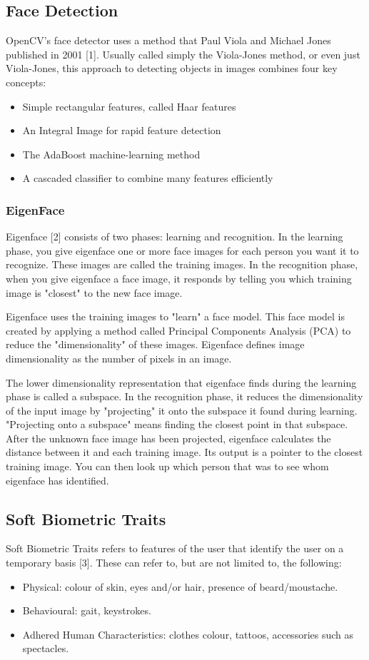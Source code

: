 \documentclass[12pt]{article}			%
\begin{document}
\subsection{ Face Detection }
OpenCV's face detector uses a method that Paul Viola and Michael Jones published in 2001 [1]. Usually called simply the Viola-Jones method, or even just Viola-Jones, this approach to detecting objects in images combines four key concepts:
\begin{itemize}
	\item{} Simple rectangular features, called Haar features
	\item{} An Integral Image for rapid feature detection
	\item{} The AdaBoost machine-learning method
	\item{} A cascaded classifier to combine many features efficiently
\end{itemize}

\subsubsection{ EigenFace }
Eigenface [2] consists of two phases: learning and recognition. In the learning phase, you give eigenface one or more face images for each person you want it to recognize. These images are called the training images. In the recognition phase, when you give eigenface a face image, it responds by telling you which training image is "closest" to the new face image.

Eigenface uses the training images to "learn" a face model. This face model is created by applying a method called Principal Components Analysis (PCA) to reduce the "dimensionality" of these images. Eigenface defines image dimensionality as the number of pixels in an image.

The lower dimensionality representation that eigenface finds during the learning phase is called a subspace. In the recognition phase, it reduces the dimensionality of the input image by "projecting" it onto the subspace it found during learning. "Projecting onto a subspace" means finding the closest point in that subspace. After the unknown face image has been projected, eigenface calculates the distance between it and each training image. Its output is a pointer to the closest training image. You can then look up which person that was to see whom eigenface has identified.

\subsection{ Soft Biometric Traits }
Soft Biometric Traits refers to features of the user that identify the user on a temporary basis [3]. These can refer to, but are not limited to, the following:
\begin{itemize}
	\item{} Physical: colour of skin, eyes and/or hair, presence of beard/moustache.
	\item{} Behavioural: gait, keystrokes.
	\item{} Adhered Human Characteristics: clothes colour, tattoos, accessories such as spectacles.
\end{itemize}
\end{document}
